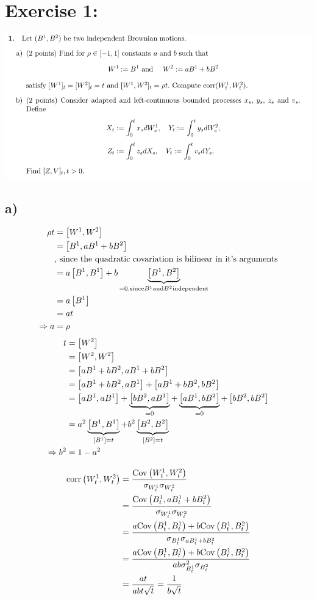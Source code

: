 \documentclass[document.tex]{subfiles}
\begin{document}
\section*{Exercise 1:}

\includegraphics[width=\textwidth]{ex1.png}

\subsection*{a)}
\begin{align*}
	\rho t &= \left[W^1 , W^2 \right] \\
	&= \left[B^1 , a B^1 + b B^2 \right] \\
	&\text{, since the quadratic covariation is bilinear in it's arguments}\\
	&= a \left[B^1 , B^1 \right] + b \underbrace{\left[B^1 , B^2 \right]}_{=0, \text{since} B^1 \text{and} B^2 \text{independent}} \\
	&= a \left[ B^1 \right] \\
	&= a t \\
\Rightarrow a &= \rho	 
\end{align*}
\begin{align*}
	t &= \left[ W^2 \right] \\
	&= \left[W^2 , W^2 \right]\\
	&= \left[a B^1 + b B^2 , a B^1 + b B^2 \right]\\
	&= \left[a B^1 + b B^2 , a B^1 \right] + \left[a B^1 + b B^2 , b B^2 \right]\\
	&= \left[aB^1 , aB^1 \right] + \underbrace{\left[bB^2 , aB^1 \right]}_{=0} + \underbrace{\left[aB^1 , bB^2 \right]}_{=0} + \left[bB^2 , bB^2 \right]\\
	&= a^2 \underbrace{\left[B^1 , B^1 \right]}_{\left[ B^1 \right]=t}+ b^2 \underbrace{\left[B^2 , B^2 \right]}_{\left[ B^2 \right]=t} \\
\Rightarrow	b^2 &= 1 - a^2
\end{align*}

\begin{align*}
	\mathrm{corr}\left(W^1_t , W^2_t\right) &= \frac{\mathrm{Cov}\left(W^1_t , W^2_t\right)}{\sigma_{W^1_t}\sigma_{W^2_t}}\\ 
	&= \frac{\mathrm{Cov}\left(B^1_t , aB^1_t + b B^2_t\right)}  {\sigma_{W^1_t}\sigma_{W^2_t}} \\
	&= \frac{a \mathrm{Cov}\left(B^1_t , B^1_t\right) + b\mathrm{Cov}\left(B^1_t , B^2_t\right)}{\sigma_{B^1_t} \sigma_{a B^1_t + b B^2_t}}\\
	&= \frac{a \mathrm{Cov}\left(B^1_t , B^1_t\right) + b\mathrm{Cov}\left(B^1_t , B^2_t\right)}{ a b \sigma_{B^1_t}^2 \sigma_{B^2_t}}\\
	&= \frac{at}{ a b t \sqrt{t}} = \frac{1}{b\sqrt{t}} 
\end{align*}
\end{document}
